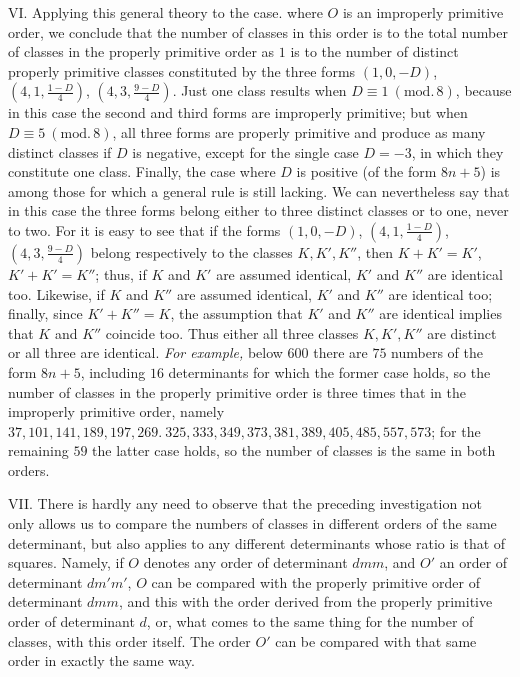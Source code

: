 VI. Applying this general theory to the case. where \(O\) is an improperly primitive order, we conclude that the number of classes in this order is to the total number of classes in the properly primitive order as \(1\) is to the number of distinct properly primitive classes constituted by the three forms \((1,0,-D)\), \((4,1,\frac{1-D}{4})\), \((4,3,\frac{9-D}{4})\). Just one class results when \(D\equiv1\ (\mathrm{mod.}\,8)\), because in this case the second and third forms are improperly primitive; but when \(D\equiv5\ (\mathrm{mod.}\,8)\), all three forms are properly primitive and produce as many distinct classes if \(D\) is negative, except for the single case \(D=-3\), in which they constitute one class. Finally, the case where \(D\) is positive (of the form \(8n+5\)) is among those for which a general rule is still lacking. We can nevertheless say that in this case the three forms
belong either to three distinct classes or to one, never to two. For it is easy to see that if the forms \((1,0,-D)\), \((4,1,\frac{1-D}{4})\), \((4,3,\frac{9-D}{4})\) belong respectively to the classes \(K,K',K''\), then \(K+K'=K'\), \(K'+K'=K''\); thus, if \(K\) and \(K'\) are assumed identical, \(K'\) and \(K''\) are identical too. Likewise, if \(K\) and \(K''\) are assumed identical, \(K'\) and \(K''\) are identical too; finally, since \(K'+K''=K\), the assumption that \(K'\) and \(K''\) are identical implies that \(K\) and \(K''\) coincide too. Thus either all three classes \(K,K',K''\) are distinct or all three are identical. \textit{For example,} below \(600\) there are \(75\) numbers of the form \(8n+5\), including \(16\) determinants for which the former case holds, so the number of classes in the properly primitive order is three times that in the improperly primitive order, namely \(37,\allowbreak 101,\allowbreak 141,\allowbreak 189,\allowbreak 197,\allowbreak 269.\ 325,\allowbreak 333,\allowbreak 349,\allowbreak 373,\allowbreak 381,\allowbreak 389,\allowbreak 405,\allowbreak 485,\allowbreak 557,\allowbreak 573\); for the remaining \(59\) the latter case holds, so the number of classes is the same in both orders.

VII. There is hardly any need to observe that the preceding investigation not only allows us to compare the numbers of classes in different orders of the same determinant, but also applies to any different determinants whose ratio is that of squares. Namely, if \(O\) denotes any order of determinant \(dmm\), and \(O'\) an order of determinant \(dm'm'\), \(O\) can be compared with the properly primitive order of determinant \(dmm\), and this with the order derived from the properly primitive order of determinant \(d\), or, what comes to the same thing for the number of classes, with this order itself. The order \(O'\) can be compared with that same order in exactly the same way.
